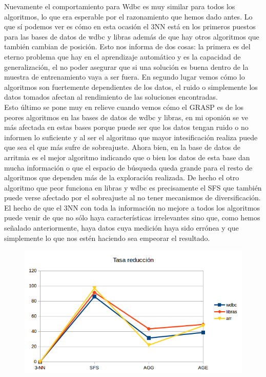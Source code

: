 \documentclass[10pt,a4paper]{article}
\begin{document}
Nuevamente el comportamiento para Wdbc es muy similar para todos los algoritmos, lo que era esperable por el razonamiento que hemos dado antes. Lo que sí podemos ver es cómo en esta ocasión el 3NN está en los primeros puestos para las bases de datos de wdbc y libras además de que hay otros algoritmos que también cambian de posición. Esto nos informa de dos cosas: la primera es del eterno problema que hay en el aprendizaje automático y es la capacidad de generalización, el no poder asegurar que si una solución es buena dentro de la muestra de entrenamiento vaya a ser fuera. En segundo lugar vemos cómo lo algoritmos son fuertemente dependientes de los datos, el ruido o simplemente los datos tomados afectan al rendimiento de las soluciones encontradas.\\

Esto último se pone muy en relieve cuando vemos cómo el GRASP es de los peores algoritmos en las bases de datos de wdbc y libras, en mi oponión se ve más afectada en estas bases porque puede ser que los datos tengan ruido o no informen lo suficiente y al ser el algoritmo que mayor intesificación realiza puede que sea el que más sufre de sobreajuste. Ahora bien, en la base de datos de arritmia es el mejor algoritmo indicando que o bien los datos de esta base dan mucha información o que el espacio de búsqueda queda grande para el resto de algoritmos que dependen más de la exploración realizada. De hecho el otro algoritmo que peor funciona en libras y wdbc es precisamente el SFS que también puede verse afectado por el sobreajuste al no tener mecanismos de diversificación.\\

El hecho de que el 3NN con toda la información no mejore a todos los algoritmos puede venir de que no sólo haya características irrelevantes sino que, como hemos señalado anteriormente, haya datos cuya medición haya sido errónea y que simplemente lo que nos estén haciendo sea empeorar el resultado.\\

\begin{figure}[H]
\centering
\includegraphics[width=130mm]{reduccion_ag.png}
\end{figure}
\end{document}

